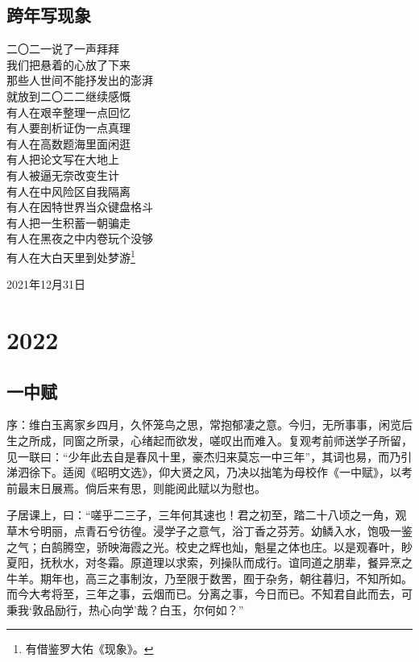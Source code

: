 \documentclass[a5paper]{ctexart}
\begin{document}
	\subsection{跨年写现象}
	\begin{center}
		二〇二一说了一声拜拜\\
		我们把悬着的心放了下来\\
		那些人世间不能抒发出的澎湃\\
		就放到二〇二二继续感慨\\
		有人在艰辛整理一点回忆\\
		有人要剖析证伪一点真理\\
		有人在高数题海里面闲逛\\
		有人把论文写在大地上\\
		有人被逼无奈改变生计\\
		有人在中风险区自我隔离\\
		有人在因特世界当众键盘格斗\\
		有人把一生积蓄一朝骗走\\
		有人在黑夜之中内卷玩个没够\\
		有人在大白天里到处梦游\footnote{有借鉴罗大佑《现象》。}
		
	\end{center}
	\begin{flushright}
		2021年12月31日
	\end{flushright}
	
	\newpage
	\section{2022}
	
	\subsection{一中赋}
	\begin{small}
		序：维白玉离家乡四月，久怀笼鸟之思，常抱郁凄之意。今归，无所事事，闲览后生之所成，同窗之所录，心绪起而欲发，嗟叹出而难入。复观考前师送学子所留，见一联曰：“少年此去自是春风十里，豪杰归来莫忘一中三年”，其词也易，而乃引涕泗徐下。适阅《昭明文选》，仰大贤之风，乃决以拙笔为母校作《一中赋》，以考前最末日展焉。倘后来有思，则能阅此赋以为慰也。
	\end{small}
	
	子居课上，曰：“嗟乎二三子，三年何其速也！君之初至，踏二十八顷之一角，观草木兮明丽，点青石兮彷徨。浸学子之意气，浴丁香之芬芳。幼鳞入水，饱吸一鉴之气；白鹄腾空，骄映海霞之光。校史之辉也灿，魁星之体也庄。以是观春叶，眇夏阳，抚秋水，对冬霜。原道理以求索，列操队而成行。谊同道之朋辈，餐异烹之牛羊。期年也，高三之事制汝，乃至限于数罟，囿于杂务，朝往暮归，不知所如。而今大考将至，三年之事，云烟而已。分离之事，今日而已。不知君自此而去，可秉我‘敦品励行，热心向学’哉？白玉，尔何如？”
	
\end{document}

